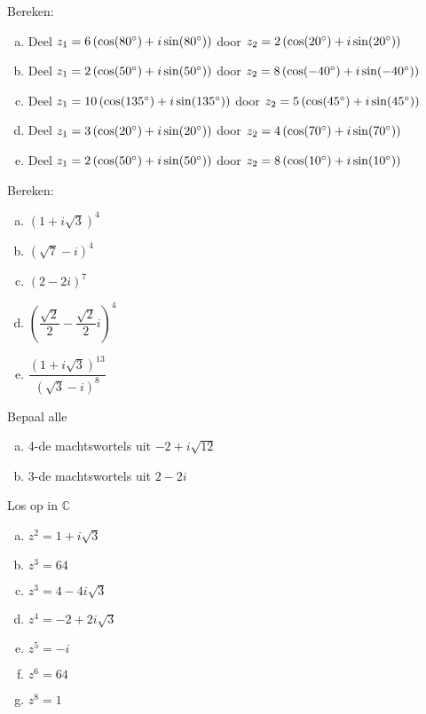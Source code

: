 \documentclass[12pt,twoside]{article}
\begin{document}
\begin{oefening}
Bereken:
\begin{enumerate}[(a)]
  \itemsep.5em
  \item Deel $z_1=6\left(\cos(80^\circ)+i\sin(80^\circ)\right)$ door $z_2=2\left(\cos(20^\circ)+i\sin(20^\circ)\right)$
  \item Deel $z_1=2\left(\cos(50^\circ)+i\sin(50^\circ)\right)$ door $z_2=8\left(\cos(-40^\circ)+i\sin(-40^\circ)\right)$
  \item Deel $z_1=10\left(\cos(135^\circ)+i\sin(135^\circ)\right)$ door $z_2=5\left(\cos(45^\circ)+i\sin(45^\circ)\right)$
  \item Deel $z_1=3\left(\cos(20^\circ)+i\sin(20^\circ)\right)$ door $z_2=4\left(\cos(70^\circ)+i\sin(70^\circ)\right)$
  \item Deel $z_1=2\left(\cos(50^\circ)+i\sin(50^\circ)\right)$ door $z_2=8\left(\cos(10^\circ)+i\sin(10^\circ)\right)$
\end{enumerate}
\end{oefening}

\begin{oefening}
Bereken:
\begin{enumerate}[(a)]
  \itemsep.5em
  \item $\displaystyle \left(1+i\sqrt{3}\right)^4$
  \item $\displaystyle \left(\sqrt{7}-i\right)^4$
  \item $\displaystyle \left(2-2i\right)^7$
  \item $\displaystyle \left(\dfrac{\sqrt{2}}{2}-\dfrac{\sqrt{2}}{2}i\right)^4$
  \item $\displaystyle \dfrac{\left(1+i\sqrt{3}\right)^{13}}{\left(\sqrt{3}-i\right)^8}$
\end{enumerate}
\end{oefening}

\begin{oefening}
Bepaal alle
\begin{enumerate}[(a)]
  \itemsep.5em
  \item 4-de machtswortels uit $-2+i\sqrt{12}$
  \item 3-de machtswortels uit $2-2i$
\end{enumerate}
\end{oefening}

\begin{oefening}
Los op in $\mathbb{C}$
\begin{enumerate}[(a)]
  \itemsep.5em
  \item $\displaystyle z^2=1+i\sqrt{3}$
  \item $\displaystyle z^3=64$
  \item $\displaystyle z^3=4-4i\sqrt{3}$
  \item $\displaystyle z^4=-2+2i\sqrt{3}$
  \item $\displaystyle z^5=-i$
  \item $\displaystyle z^6=64$
  \item $\displaystyle z^8=1$
\end{enumerate}
\end{oefening}
\end{document}
